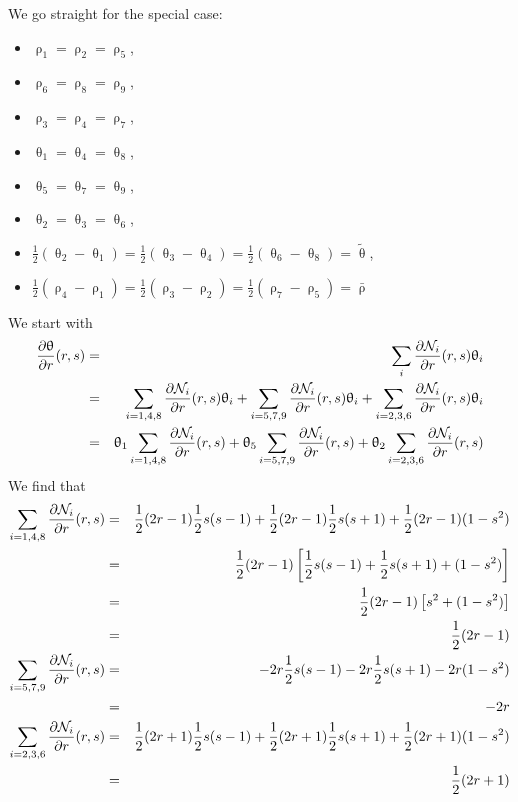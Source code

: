 We go straight for the special case: 
\begin{itemize}
\item $\uprho_1=\uprho_2=\uprho_5$,
\item $\uprho_6=\uprho_8=\uprho_9$,
\item $\uprho_3=\uprho_4=\uprho_7$,
\item $\uptheta_1=\uptheta_4=\uptheta_8$,
\item $\uptheta_5=\uptheta_7=\uptheta_9$,
\item $\uptheta_2=\uptheta_3=\uptheta_6$,
\item $\frac12(\uptheta_2-\uptheta_1)=\frac12(\uptheta_3-\uptheta_4)=\frac12(\uptheta_6-\uptheta_8)=\tilde{\uptheta}$,
\item $\frac12(\uprho_4-\uprho_1)=\frac12(\uprho_3-\uprho_2)=\frac12(\uprho_7-\uprho_5)=\bar{\uprho}$ \nn
\end{itemize}
We start with
\begin{eqnarray}
\frac{\partial\uptheta}{\partial r}(r,s) 
&=& \sum_i \frac{\partial {\mathcal{N}}_i}{\partial r}(r,s)  \uptheta_i \nonumber\\
&=& \sum_{i=1,4,8} \frac{\partial {\mathcal{N}}_i}{\partial r}(r,s)  \uptheta_i
+\sum_{i=5,7,9} \frac{\partial {\mathcal{N}}_i}{\partial r}(r,s)  \uptheta_i
+\sum_{i=2,3,6} \frac{\partial {\mathcal{N}}_i}{\partial r}(r,s)  \uptheta_i \nonumber\\
&=& \uptheta_1\sum_{i=1,4,8} \frac{\partial {\mathcal{N}}_i}{\partial r}(r,s) 
+\uptheta_5\sum_{i=5,7,9} \frac{\partial {\mathcal{N}}_i}{\partial r}(r,s)  
+\uptheta_2\sum_{i=2,3,6} \frac{\partial {\mathcal{N}}_i}{\partial r}(r,s)  
\end{eqnarray}
We find that 
\begin{eqnarray}
\sum_{i=1,4,8} \frac{\partial {\mathcal{N}}_i}{\partial r}(r,s)
&=& \frac{1}{2}(2r-1)  \frac{1}{2}s(s-1)
+ \frac{1}{2}(2r-1)  \frac{1}{2}s(s+1) 
+ \frac{1}{2}(2r-1)     (1-s^2) \nonumber\\
&=& \frac{1}{2}(2r-1) \left[ \frac{1}{2}s(s-1) + \frac{1}{2}s(s+1) +   (1-s^2)\right] \nonumber\\
&=& \frac{1}{2}(2r-1) \left[ s^2 +   (1-s^2)\right] \nonumber\\
&=& \frac{1}{2}(2r-1) 
\nonumber\\
\sum_{i=5,7,9} \frac{\partial {\mathcal{N}}_i}{\partial r}(r,s) 
&=& -2r \frac{1}{2}s(s-1)
-2r \frac{1}{2}s(s+1) 
-2r    (1-s^2) \nonumber\\
&=& -2r \nonumber\\
\sum_{i=2,3,6} \frac{\partial {\mathcal{N}}_i}{\partial r}(r,s) 
&=& \frac{1}{2}(2r+1)  \frac{1}{2}s(s-1)
+ \frac{1}{2}(2r+1)  \frac{1}{2}s(s+1) 
+ \frac{1}{2}(2r+1)     (1-s^2) \nonumber\\
&=& \frac{1}{2}(2r+1)  \nonumber
\end{eqnarray}
